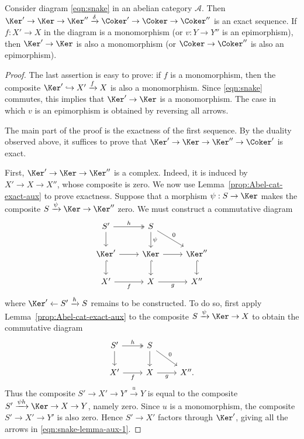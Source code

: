 \begin{theorem}\label{prop:snake-lemma}
	Consider diagram \eqref{eqn:snake} in an abelian category $\mathcal{A}$.
	Then
	$\Ker'\to\Ker\to\Ker''\xrightarrow{\delta}\Coker'\to\Coker\to\Coker''$
	is an exact sequence. If $f:X'\to X$ in the diagram is a monomorphism (or
	$v:Y\to Y''$ is an epimorphism), then $\Ker'\to\Ker$ is also a
	monomorphism (or $\Coker\to\Coker''$ is also an epimorphism).
\end{theorem}
\begin{proof}
	The last assertion is easy to prove: if $f$ is a monomorphism, then the
	composite $\Ker'\hookrightarrow X'\xrightarrow{f}X$ is also a
	monomorphism. Since \eqref{eqn:snake} commutes, this implies that
	$\Ker'\to\Ker$ is a monomorphism. The case in which $v$ is an epimorphism
	is obtained by reversing all arrows.

	The main part of the proof is the exactness of the first sequence. By the
	duality observed above, it suffices to prove that
	$\Ker'\to\Ker\to\Ker''\to\Coker'$ is exact.
	
	First, $\Ker'\to\Ker\to\Ker''$ is a complex. Indeed, it is induced by
	$X'\to X\to X''$, whose composite is zero. We now use
	Lemma~\ref{prop:Abel-cat-exact-aux} to prove exactness. Suppose that a
	morphism $\psi:S\to\Ker$ makes the composite
	$S\xrightarrow{\psi}\Ker\to\Ker''$ zero. We must construct a commutative
	diagram
	\begin{equation}\label{eqn:snake-lemma-aux-1}
	\begin{tikzcd}
		S' \arrow[twoheadrightarrow, r, "h"] \arrow[d] & S \arrow[d, "\psi"] \arrow[rd, "0"] & \\
		\Ker' \arrow[r] \arrow[hookrightarrow, d] & \Ker \arrow[hookrightarrow, d] \arrow[r] & \Ker'' \arrow[hookrightarrow, d] \\
		X' \arrow[r, "f"'] & X \arrow[r, "g"'] & X''
	\end{tikzcd}\end{equation}
	where $\Ker'\leftarrow S'\xrightarrow{h}S$ remains to be constructed. To
	do so, first apply Lemma~\ref{prop:Abel-cat-exact-aux} to the composite
	$S\xrightarrow{\psi}\Ker\to X$ to obtain the commutative diagram
	\[\begin{tikzcd}
		S' \arrow[twoheadrightarrow, r, "h"] \arrow[d] & S \arrow[d] \arrow[rd, "0"] & \\
		X' \arrow[r, "f"'] & X \arrow[r, "g"'] & X'' .
	\end{tikzcd}\]
	Thus the composite $S'\to X'\to Y'\xrightarrow{u}Y$ is equal to the
	composite $S'\xrightarrow{\psi h}\Ker\to X\to Y$, namely zero. Since $u$
	is a monomorphism, the composite $S'\to X'\to Y'$ is also zero. Hence
	$S'\to X'$ factors through $\Ker'$, giving all the arrows in
	\eqref{eqn:snake-lemma-aux-1}.
	

\end{proof}
